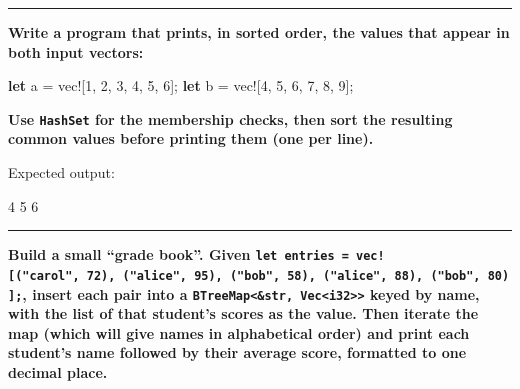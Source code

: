 \documentclass[
  11pt,
]{article}
\newenvironment{Shaded}{}{}
\newcommand{\DecValTok}[1]{\textcolor[rgb]{0.25,0.63,0.44}{#1}}
\newcommand{\KeywordTok}[1]{\textcolor[rgb]{0.00,0.44,0.13}{\textbf{#1}}}
\newcommand{\NormalTok}[1]{#1}
\newcommand{\OperatorTok}[1]{\textcolor[rgb]{0.40,0.40,0.40}{#1}}
\newcommand{\PreprocessorTok}[1]{\textcolor[rgb]{0.74,0.48,0.00}{#1}}
\begin{document}
\begin{Shaded}
\begin{Highlighting}[]


\end{Highlighting}
\end{Shaded}

\begin{center}\rule{0.5\linewidth}{0.5pt}\end{center}

\textbf{Write a program that prints, in sorted order, the values that
appear in both input vectors:}

\begin{Shaded}
\begin{Highlighting}[]
\KeywordTok{let}\NormalTok{ a }\OperatorTok{=} \PreprocessorTok{vec!}\NormalTok{[}\DecValTok{1}\OperatorTok{,} \DecValTok{2}\OperatorTok{,} \DecValTok{3}\OperatorTok{,} \DecValTok{4}\OperatorTok{,} \DecValTok{5}\OperatorTok{,} \DecValTok{6}\NormalTok{]}\OperatorTok{;}
\KeywordTok{let}\NormalTok{ b }\OperatorTok{=} \PreprocessorTok{vec!}\NormalTok{[}\DecValTok{4}\OperatorTok{,} \DecValTok{5}\OperatorTok{,} \DecValTok{6}\OperatorTok{,} \DecValTok{7}\OperatorTok{,} \DecValTok{8}\OperatorTok{,} \DecValTok{9}\NormalTok{]}\OperatorTok{;}
\end{Highlighting}
\end{Shaded}

\textbf{Use \texttt{HashSet} for the membership checks, then sort the
resulting common values before printing them (one per line).}

Expected output:

\begin{Shaded}
\begin{Highlighting}[]
\NormalTok{4}
\NormalTok{5}
\NormalTok{6}
\end{Highlighting}
\end{Shaded}

\begin{Shaded}
\begin{Highlighting}[]


\end{Highlighting}
\end{Shaded}

\begin{center}\rule{0.5\linewidth}{0.5pt}\end{center}

\textbf{Build a small ``grade book''. Given
\texttt{let\ entries\ =\ vec!{[}("carol",\ 72),\ ("alice",\ 95),\ ("bob",\ 58),\ ("alice",\ 88),\ ("bob",\ 80){]};},
insert each pair into a
\texttt{BTreeMap\textless{}\&str,\ Vec\textless{}i32\textgreater{}\textgreater{}}
keyed by name, with the list of that student's scores as the value. Then
iterate the map (which will give names in alphabetical order) and print
each student's name followed by their average score, formatted to one
decimal place.}
\end{document}
